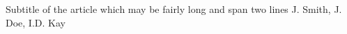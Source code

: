 %
  {Subtitle of the article which may be fairly long and span two lines}%
  {J. Smith, J. Doe, I.D. Kay}




\elrend
